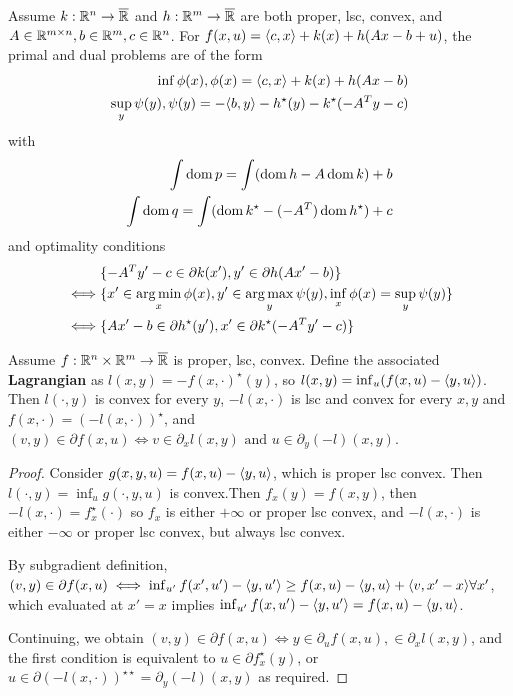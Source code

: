 \begin{thm}
  \label{sec:duality-optimization-7}
  Assume $k: \mathbb{R}^{n} \rightarrow \overline {\mathbb{R}}$ and $h: \mathbb{R}^{m}
  \rightarrow \overline {\mathbb{R}}$ are both proper, lsc, convex, and $A \in
  \mathbb{R}^{m \times n}, b \in \mathbb{R}^{m}, c \in \mathbb{R}^{n}$. For $f(x, u) = \IP{c,
    x} + k(x) + h(Ax - b + u)$, the primal and dual problems are of
  the form
  \begin{align}
    \label{eq:43}
    \inf \phi(x), \phi(x) = \IP{c, x} + k(x) + h(Ax - b) \\
    \label{eq:44}
    \sup_{y} \psi(y), \psi(y) = -\IP{b, y} - h^{\star}(y) -
    k^{\star}(-A^{T}y - c)
  \end{align} with
  \begin{align}
    \label{eq:45}
    \int \operatorname*{dom} p = \int (\operatorname*{dom} h - A \operatorname*{dom} k) + b \\
    \label{eq:46}
    \int \operatorname*{dom} q = \int(\operatorname*{dom} k^{\star} - (-A^{T}) \operatorname*{dom} h^{\star}) + c
  \end{align}
  and optimality conditions
  \begin{align}
    \label{eq:47}
    & \{ -A^{T} y' - c \in \partial k(x'), y' \in \partial h(Ax' - b)
    \} \\
    \iff &\{ x' \in \operatorname*{arg\,min}_{x} \phi(x), y' \in \operatorname*{arg\,max}_{y} \psi(y), \inf_{x} \phi(x) = \sup_{y} \psi(y) \} \\
    \iff &\{ Ax' - b \in \partial h^{\star}(y'), x' \in \partial k^{\star}(-A^{T} y' - c) \}
  \end{align}
\end{thm}

\begin{thm}
  \label{sec:duality-optimization-8}
  Assume $f: \mathbb{R}^{n} \times \mathbb{R}^{m} \rightarrow \overline {\mathbb{R}}$ is proper,
  lsc, convex.  Define the associated \textbf{Lagrangian} as $l(x, y)
  = -f(x, \cdot)^{\star}(y)$, so $l(x, y) = \inf_{u}(f(x, u) - \IP{y,
    u})$.  Then $l(\cdot, y)$ is convex for every $y$, $-l(x, \cdot)$
  is lsc and convex for every $x, y$ and $f(x, \cdot) = (-l(x,
  \cdot))^{\star}$, and $(v, y) \in \partial f(x, u) \iff v
  \in \partial_{x} l(x, y) \text{ and } u \in \partial_{y}(-l)(x, y)$.
\end{thm}

\begin{proof}
  Consider $g(x, y, u) = f(x, u) - \IP{y, u}$, which is proper lsc
  convex. Then $l(\cdot, y) = \inf_{u} g(\cdot, y, u)$ is convex.Then
  $f_{x}(y) = f(x, y)$, then $-l(x, \cdot) = f^{\star}_{x}(\cdot)$ so
  $f_{x}$ is either $+\infty$ or proper lsc convex, and $-l(x, \cdot)$
  is either $-\infty$ or proper lsc convex, but always lsc convex.

  By subgradient definition, $(v, y) \in \partial f(x, u) \iff
  \inf_{u'} f(x', u') - \IP{y, u'} \geq f(x, u) - \IP{y, u} + \IP{v,
    x' - x} \forall x'$, which evaluated at $x' = x$ implies
  $\inf_{u'} f(x, u') - \IP{y, u'} = f(x, u) - \IP{y, u}$.

  Continuing, we obtain $(v, y) \in \partial f(x, u) \iff y
  \in \partial_{u} f(x, u),  \in \partial_{x} l(x, y)$, and the first
  condition is equivalent to $u \in \partial f^{\star}_{x}(y)$, or $u
  \in \partial (- l(x, \cdot))^{\star \star} = \partial_{y}(-l)(x, y)$
  as required.
\end{proof}

